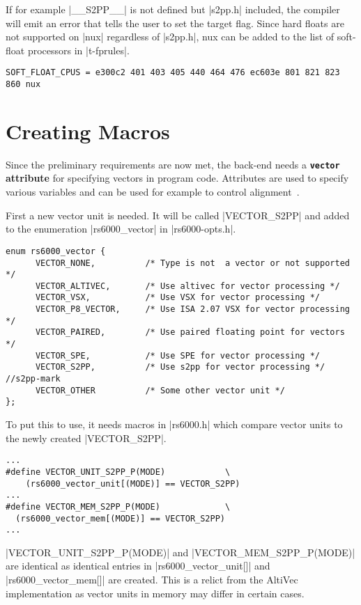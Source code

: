 If for example |__S2PP__| is not defined but |s2pp.h| included, the compiler will emit an error that tells the user to set the target flag.
Since hard floats are not supported on |nux| regardless of |s2pp.h|, nux can be added to the list of soft-float processors in |t-fprules|.
\begin{lstlisting}
SOFT_FLOAT_CPUS = e300c2 401 403 405 440 464 476 ec603e 801 821 823 860 nux
\end{lstlisting}

\section{Creating Macros}
Since the preliminary requirements are now met, the back-end needs a \textbf{{\tt vector} attribute} for specifying vectors in program code.
Attributes are used to specify various variables and can be used for example to control alignment~\citep[ch.~16.19]{GCCint}.

First a new vector unit is needed.
It will be called |VECTOR_S2PP| and added to the enumeration |rs6000_vector| in |rs6000-opts.h|.
\begin{lstlisting}
enum rs6000_vector {
      VECTOR_NONE,          /* Type is not  a vector or not supported */
      VECTOR_ALTIVEC,       /* Use altivec for vector processing */
      VECTOR_VSX,           /* Use VSX for vector processing */
      VECTOR_P8_VECTOR,     /* Use ISA 2.07 VSX for vector processing */
      VECTOR_PAIRED,        /* Use paired floating point for vectors */
      VECTOR_SPE,           /* Use SPE for vector processing */
      VECTOR_S2PP,          /* Use s2pp for vector processing */ //s2pp-mark
      VECTOR_OTHER          /* Some other vector unit */
};
\end{lstlisting}

To put this to use, it needs macros in |rs6000.h| which compare vector units to the newly created |VECTOR_S2PP|.
\begin{lstlisting}
...
#define VECTOR_UNIT_S2PP_P(MODE)            \
    (rs6000_vector_unit[(MODE)] == VECTOR_S2PP)
...
#define VECTOR_MEM_S2PP_P(MODE)             \
  (rs6000_vector_mem[(MODE)] == VECTOR_S2PP)
...
\end{lstlisting}

|VECTOR_UNIT_S2PP_P(MODE)| and |VECTOR_MEM_S2PP_P(MODE)| are identical as identical entries in |rs6000_vector_unit[]| and |rs6000_vector_mem[]| are created.
This is a relict from the AltiVec implementation as vector units in memory may differ in certain cases. 

